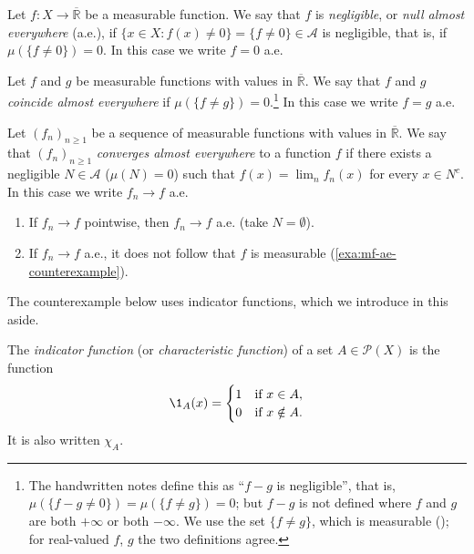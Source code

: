 \begin{definition}\label{def:mf-ae-null}
Let $f:X\to\overline{\mathbb R}$ be a measurable function. We say that $f$ is
\emph{negligible}, or \emph{null almost everywhere} (a.e.), if
$\{x\in X:f(x)\ne0\}=\{f\ne0\}\in\mathcal A$ is negligible, that is, if $\mu(\{f\ne0\})=0$. In
this case we write $f=0$ a.e.
\end{definition}

\begin{definition}\label{def:mf-ae-equal}
Let $f$ and $g$ be measurable functions with values in $\overline{\mathbb R}$. We say that $f$
and $g$ \emph{coincide almost everywhere} if
$\mu(\{f\ne g\})=0$.\footnote{The handwritten notes define this as ``$f-g$ is negligible'',
that is, $\mu(\{f-g\ne0\})=\mu(\{f\ne g\})=0$; but $f-g$ is not defined where $f$ and $g$ are
both $+\infty$ or both $-\infty$. We use the set $\{f\ne g\}$, which is measurable
(); for real-valued $f$, $g$ the two definitions agree.} In this case we
write $f=g$ a.e.
\end{definition}

\begin{definition}\label{def:mf-ae-convergence}
Let $(f_n)_{n\ge1}$ be a sequence of measurable functions with values in
$\overline{\mathbb R}$. We say that $(f_n)_{n\ge1}$ \emph{converges almost everywhere}
to a function $f$ if there exists a negligible $N\in\mathcal A$ ($\mu(N)=0$) such that
$f(x)=\lim_nf_n(x)$ for every $x\in N^c$. In this case we write $f_n\to f$ a.e.
\end{definition}

\begin{remark}\label{rem:mf-ae}
\begin{enumerate}[label=(\arabic*)]
  \item If $f_n\to f$ pointwise, then $f_n\to f$ a.e. (take $N=\emptyset$).
  \item If $f_n\to f$ a.e., it does not follow that $f$ is measurable
    (\cref{exa:mf-ae-counterexample}).
\end{enumerate}
\end{remark}

\begin{remark}\label{rem:mf-aside}
The counterexample below uses indicator functions, which we introduce in this aside.
\end{remark}

\begin{definition}\label{def:mf-indicator}
The \emph{indicator function} (or \emph{characteristic function}) of a set $A\in\mathcal P(X)$
is the function
\[
  \1_A(x)=\begin{cases}1 & \text{if } x\in A,\\ 0 & \text{if } x\notin A.\end{cases}
\]
It is also written $\chi_A$.
\end{definition}

